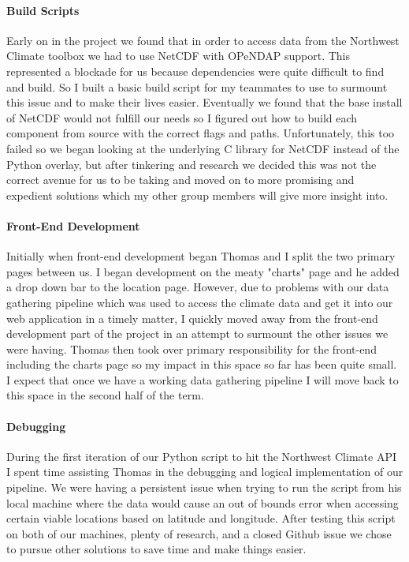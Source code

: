 \documentclass[onecolumn, draftclsnofoot,10pt, compsoc]{article}
\begin{document}
        \paragraph{Build Scripts}
	Early on in the project we found that in order to access data from the Northwest Climate toolbox we had to use NetCDF with OPeNDAP support. This represented a blockade for us because dependencies were quite difficult to find and build. So I built a basic build script for my teammates to use to surmount this issue and to make their lives easier. Eventually we found that the base install of NetCDF would not fulfill our needs so I figured out how to build each component from source with the correct flags and paths. Unfortunately, this too failed so we began looking at the underlying C library for NetCDF instead of the Python overlay, but after tinkering and research we decided this was not the correct avenue for us to be taking and moved on to more promising and expedient solutions which my other group members will give more insight into.
        \paragraph{Front-End Development}
        Initially when front-end development began Thomas and I split the two primary pages between us. I began development on the meaty "charts" page and he added a drop down bar to the location page. However, due to problems with our data gathering pipeline which was used to access the climate data and get it into our web application in a timely matter, I quickly moved away from the front-end development part of the project in an attempt to surmount the other issues we were having. Thomas then took over primary responsibility for the front-end including the charts page so my impact in this space so far has been quite small. I expect that once we have a working data gathering pipeline I will move back to this space in the second half of the term.
        \paragraph{Debugging}
        During the first iteration of our Python script to hit the Northwest Climate API I spent time assisting Thomas in the debugging and logical implementation of our pipeline. We were having a persistent issue when trying to run the script from his local machine where the data would cause an out of bounds error when accessing certain viable locations based on latitude and longitude. After testing this script on both of our machines, plenty of research, and a closed Github issue we chose to pursue other solutions to save time and make things easier.
\end{document}
